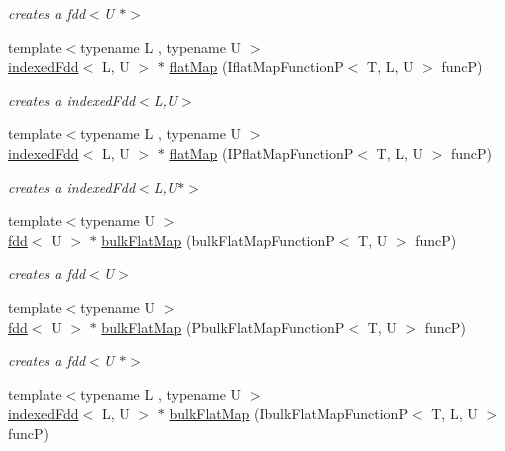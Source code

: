 \begin{DoxyCompactItemize}
\begin{DoxyCompactList}\small\item\em creates a fdd$<$\+U $\ast$$>$ \end{DoxyCompactList}\item 
{\footnotesize template$<$typename L , typename U $>$ }\\\hyperlink{classfaster_1_1indexedFdd}{indexed\+Fdd}$<$ L, U $>$ $\ast$ \hyperlink{group__flatmap_ga499a1c3638cc1e95e483cd91c7a884a7}{flat\+Map} (Iflat\+Map\+FunctionP$<$ T, L, U $>$ funcP)
\begin{DoxyCompactList}\small\item\em creates a indexed\+Fdd$<$\+L,\+U$>$ \end{DoxyCompactList}\item 
{\footnotesize template$<$typename L , typename U $>$ }\\\hyperlink{classfaster_1_1indexedFdd}{indexed\+Fdd}$<$ L, U $>$ $\ast$ \hyperlink{group__flatmap_gab1c639e6fe55d66ac0cb50011d537567}{flat\+Map} (I\+Pflat\+Map\+FunctionP$<$ T, L, U $>$ funcP)
\begin{DoxyCompactList}\small\item\em creates a indexed\+Fdd$<$\+L,\+U$\ast$$>$ \end{DoxyCompactList}\item 
{\footnotesize template$<$typename U $>$ }\\\hyperlink{classfaster_1_1fdd}{fdd}$<$ U $>$ $\ast$ \hyperlink{group__bulk_ga6f87b4e650b28ea32c363f6d902babb1}{bulk\+Flat\+Map} (bulk\+Flat\+Map\+FunctionP$<$ T, U $>$ funcP)
\begin{DoxyCompactList}\small\item\em creates a fdd$<$\+U$>$ \end{DoxyCompactList}\item 
{\footnotesize template$<$typename U $>$ }\\\hyperlink{classfaster_1_1fdd}{fdd}$<$ U $>$ $\ast$ \hyperlink{group__bulk_ga77058c1365a8696105acaf1468e8d3b4}{bulk\+Flat\+Map} (Pbulk\+Flat\+Map\+FunctionP$<$ T, U $>$ funcP)
\begin{DoxyCompactList}\small\item\em creates a fdd$<$\+U $\ast$$>$ \end{DoxyCompactList}\item 
{\footnotesize template$<$typename L , typename U $>$ }\\\hyperlink{classfaster_1_1indexedFdd}{indexed\+Fdd}$<$ L, U $>$ $\ast$ \hyperlink{group__bulk_gadfcb736f7161db476dbbb275f1d08659}{bulk\+Flat\+Map} (Ibulk\+Flat\+Map\+FunctionP$<$ T, L, U $>$ funcP)

\end{DoxyCompactItemize}
